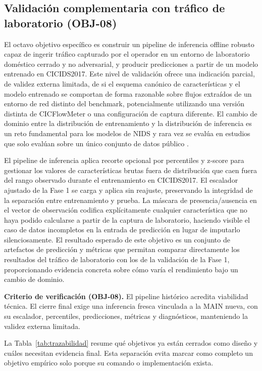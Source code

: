 \subsection{Validación complementaria con tráfico de laboratorio (OBJ-08)}
El octavo objetivo específico es construir un pipeline de inferencia offline robusto capaz de ingerir tráfico capturado por el operador en un entorno de laboratorio doméstico cerrado y no adversarial, y producir predicciones a partir de un modelo entrenado en CICIDS2017. Este nivel de validación ofrece una indicación parcial, de validez externa limitada, de si el esquema canónico de características y el modelo entrenado se comportan de forma razonable sobre flujos extraídos de un entorno de red distinto del benchmark, potencialmente utilizando una versión distinta de CICFlowMeter o una configuración de captura diferente. El cambio de dominio entre la distribución de entrenamiento y la distribución de inferencia es un reto fundamental para los modelos de NIDS y rara vez se evalúa en estudios que solo evalúan sobre un único conjunto de datos público \parencite{Apruzzese2022CrossEvaluationNIDS,Layeghy2023CrossDomainNIDS}.

El pipeline de inferencia aplica recorte opcional por percentiles y z-score para gestionar los valores de características brutas fuera de distribución que caen fuera del rango observado durante el entrenamiento en CICIDS2017. El escalador ajustado de la Fase 1 se carga y aplica sin reajuste, preservando la integridad de la separación entre entrenamiento y prueba. La máscara de presencia/ausencia en el vector de observación codifica explícitamente cualquier característica que no haya podido calcularse a partir de la captura de laboratorio, haciendo visible el caso de datos incompletos en la entrada de predicción en lugar de imputarlo silenciosamente. El resultado esperado de este objetivo es un conjunto de artefactos de predicción y métricas que permitan comparar directamente los resultados del tráfico de laboratorio con los de la validación de la Fase 1, proporcionando evidencia concreta sobre cómo varía el rendimiento bajo un cambio de dominio.

\textbf{Criterio de verificación (OBJ-08).} El pipeline histórico acredita viabilidad técnica. El cierre final exige una inferencia fresca vinculada a la MAIN nueva, con su escalador, percentiles, predicciones, métricas y diagnósticos, manteniendo la validez externa limitada.

La Tabla~\ref{tab:trazabilidad} resume qué objetivos ya están cerrados como diseño y cuáles necesitan evidencia final. Esta separación evita marcar como completo un objetivo empírico solo porque su comando o implementación exista.

